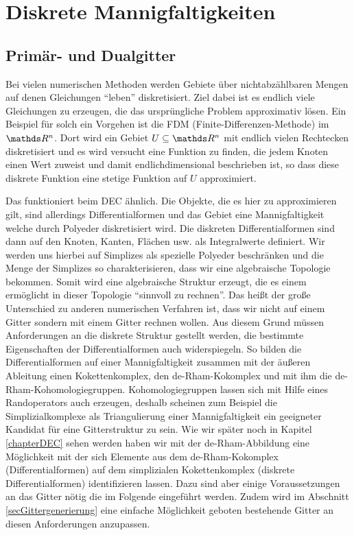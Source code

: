 \renewcommand{\d}{\mathrm{d}}


\chapter{Diskrete Mannigfaltigkeiten}

\section{Primär- und Dualgitter}
  
  \begin{ziel}
    Bei vielen numerischen Methoden werden Gebiete über nichtabzählbaren Mengen auf denen Gleichungen "`leben"' diskretisiert.
    Ziel dabei ist es endlich viele Gleichungen zu erzeugen, die das ursprüngliche Problem approximativ lösen.
    Ein Beispiel für solch ein Vorgehen ist die FDM (Finite-Differenzen-Methode) im \( \R^{n} \).
    Dort wird ein Gebiet \( U\subseteq\R^{n} \) mit endlich vielen Rechtecken diskretisiert 
    und es wird versucht eine Funktion zu finden, die jedem Knoten einen Wert zuweist und damit endlichdimensional beschrieben ist, so dass diese
    diskrete Funktion eine stetige Funktion auf \( U \) approximiert. 

    Das funktioniert beim DEC ähnlich. Die Objekte, die es hier zu approximieren gilt, sind allerdings Differentialformen und das Gebiet eine
    Mannigfaltigkeit welche durch Polyeder diskretisiert wird. Die diskreten Differentialformen sind dann auf den Knoten, Kanten, Flächen usw. als Integralwerte
    definiert. Wir werden uns hierbei auf Simplizes als spezielle Polyeder beschränken und die Menge der Simplizes so charakterisieren, dass wir
    eine algebraische Topologie bekommen. Somit wird eine algebraische Struktur erzeugt, die es einem ermöglicht in dieser Topologie
    "`sinnvoll zu rechnen"'.
    Das heißt der große Unterschied zu anderen numerischen Verfahren ist, dass wir nicht auf einem Gitter sondern mit einem Gitter rechnen wollen.
    Aus diesem Grund müssen Anforderungen an die diskrete Struktur gestellt werden, die bestimmte Eigenschaften der Differentialformen auch widerspiegeln.
    So bilden die Differentialformen auf einer Mannigfaltigkeit zusammen mit der äußeren Ableitung einen Kokettenkomplex, den de-Rham-Kokomplex und mit ihm die de-Rham-Kohomologiegruppen.
    Kohomologiegruppen lassen sich mit Hilfe eines Randoperators auch erzeugen, deshalb scheinen zum
    Beispiel
    die Simplizialkomplexe als Triangulierung einer Mannigfaltigkeit ein geeigneter Kandidat für
    eine Gitterstruktur zu sein.
    Wie wir später noch in Kapitel \ref{chapterDEC} sehen werden haben wir mit der de-Rham-Abbildung eine Möglichkeit mit der sich Elemente aus dem de-Rham-Kokomplex
    (Differentialformen) auf dem simplizialen Kokettenkomplex (diskrete Differentialformen) identifizieren lassen.
    Dazu sind aber einige Voraussetzungen an das Gitter nötig die im Folgende eingeführt werden.
    Zudem wird im Abschnitt \ref{secGittergenerierung} eine einfache Möglichkeit geboten bestehende Gitter an diesen Anforderungen anzupassen.
  \end{ziel}

